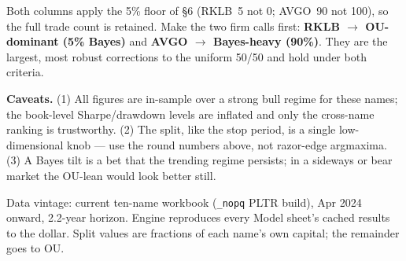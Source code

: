 \documentclass[11pt]{article}
\begin{document}
Both columns apply the 5\% floor of \S6 (RKLB~5 not 0; AVGO~90 not 100), so the full trade count
is retained. Make the two firm calls first: \textbf{RKLB $\to$ OU-dominant (5\% Bayes)} and
\textbf{AVGO $\to$ Bayes-heavy (90\%)}. They are the largest, most robust corrections to the
uniform 50/50 and hold under both criteria.

\textbf{Caveats.} (1) All figures are in-sample over a strong bull regime for these names; the
book-level Sharpe/drawdown levels are inflated and only the cross-name ranking is trustworthy.
(2) The split, like the stop period, is a single low-dimensional knob --- use the round numbers
above, not razor-edge argmaxima. (3) A Bayes tilt is a bet that the trending regime persists; in
a sideways or bear market the OU-lean would look better still.

\vfill
{\footnotesize\color{bcgrey} Data vintage: current ten-name workbook (\texttt{\_nopq} PLTR
build), Apr 2024 onward, 2.2-year horizon. Engine reproduces every Model sheet's cached results
to the dollar. Split values are fractions of each name's own capital; the remainder goes to OU.}
\end{document}
